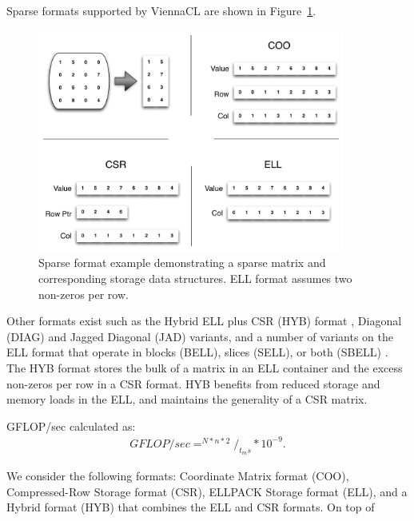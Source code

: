 \documentclass{report}
\begin{document}
Sparse formats supported by ViennaCL are shown in Figure~\ref{fig:sparse_format}.

\begin{figure}
\centering
\includegraphics[width=0.9\textwidth]{gpu_content/omnigraffle/SparseStorage.pdf}
\caption{Sparse format example demonstrating a sparse matrix and corresponding storage data structures. ELL format assumes two non-zeros per row. }
\label{fig:sparse_format}
\end{figure}

Other formats exist such as the Hybrid ELL plus CSR (HYB) format \cite{Bell2009}, Diagonal (DIAG) and Jagged Diagonal (JAD) variants, and a number of variants on the ELL format that operate in blocks (BELL), slices (SELL), or both (SBELL) \cite{SuKeutzer2012}. The HYB format stores the bulk of a matrix in an ELL container and the excess non-zeros per row in a CSR format. HYB benefits from reduced storage and memory loads in the ELL, and maintains the generality of a CSR matrix. 


GFLOP/sec calculated as: 
\begin{align}
GFLOP/sec = ^{N * n * 2} /_{t_ms} * 10^{-9}. 
\end{align}


We consider the following formats: Coordinate Matrix format (COO), Compressed-Row Storage format (CSR), ELLPACK Storage format (ELL), and a Hybrid format (HYB) that combines the ELL and CSR formats. On top of 
\end{document}
